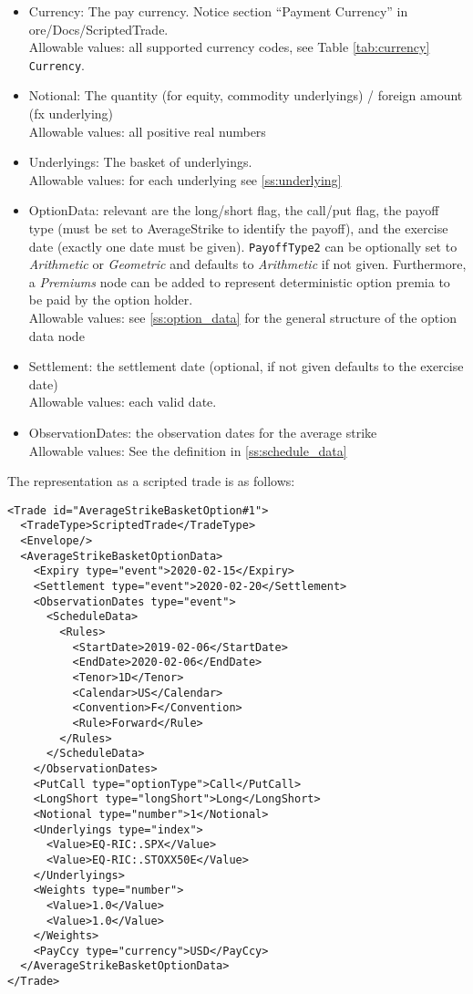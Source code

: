 \begin{itemize}
\item Currency: The pay currency. Notice section ``Payment Currency'' in ore/Docs/ScriptedTrade. \\
  Allowable values: all supported currency codes, see Table \ref{tab:currency} \lstinline!Currency!.
\item Notional: The quantity (for equity, commodity underlyings) / foreign amount (fx underlying) \\
  Allowable values: all positive real numbers
\item Underlyings: The basket of underlyings. \\
  Allowable values: for each underlying see \ref{ss:underlying}
\item OptionData: relevant are the long/short flag, the call/put flag, the payoff type (must be set to AverageStrike to
  identify the payoff), and the exercise date (exactly one date must be given). \lstinline!PayoffType2! can be optionally set to \emph{Arithmetic} or \emph{Geometric} and defaults to \emph{Arithmetic} if not given. Furthermore, a \emph{Premiums} node can be added to represent deterministic option premia to be paid by the option holder. \\
  Allowable values: see \ref{ss:option_data} for the general structure of the option data node
\item Settlement: the settlement date (optional, if not given defaults to the exercise date) \\
  Allowable values: each valid date.
\item ObservationDates: the observation dates for the average strike \\
  Allowable values: See the definition in \ref{ss:schedule_data}
\end{itemize}

The representation as a scripted trade is as follows:

\begin{verbatim}
<Trade id="AverageStrikeBasketOption#1">
  <TradeType>ScriptedTrade</TradeType>
  <Envelope/>
  <AverageStrikeBasketOptionData>
    <Expiry type="event">2020-02-15</Expiry>
    <Settlement type="event">2020-02-20</Settlement>
    <ObservationDates type="event">
      <ScheduleData>
        <Rules>
          <StartDate>2019-02-06</StartDate>
          <EndDate>2020-02-06</EndDate>
          <Tenor>1D</Tenor>
          <Calendar>US</Calendar>
          <Convention>F</Convention>
          <Rule>Forward</Rule>
        </Rules>
      </ScheduleData>
    </ObservationDates>
    <PutCall type="optionType">Call</PutCall>
    <LongShort type="longShort">Long</LongShort>
    <Notional type="number">1</Notional>
    <Underlyings type="index">
      <Value>EQ-RIC:.SPX</Value>
      <Value>EQ-RIC:.STOXX50E</Value>
    </Underlyings>
    <Weights type="number">
      <Value>1.0</Value>
      <Value>1.0</Value>
    </Weights>
    <PayCcy type="currency">USD</PayCcy>
  </AverageStrikeBasketOptionData>
</Trade>
\end{verbatim}


